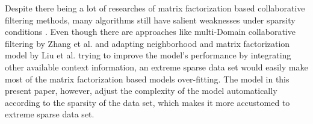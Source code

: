 Despite there being a lot of researches of matrix factorization based
collaborative filtering methods, many algorithms still have salient
weaknesses under sparsity conditions
\cite{cacheda2011comparison}. Even though there are approaches like
multi-Domain collaborative filtering by Zhang et al. and adapting
neighborhood and matrix factorization model by Liu et al. trying to
improve the model's performance by integrating other available context
information\cite{zhang2012multi, liu2010adapting}, an extreme sparse
data set would easily make most of the matrix factorization based
models over-fitting. The {\sppan} model in this present paper, however,
adjust the complexity of the model automatically according to the
sparsity of the data set, which makes it more accustomed to extreme
sparse data set.
